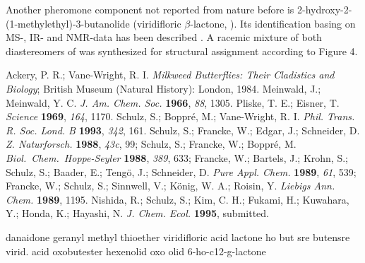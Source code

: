 \documentclass[11pt]{article}
\begin{document}
Another pheromone component not reported from nature before is
2-hydroxy-2-(1-methylethyl)-3-butanolide (viridifloric  $\beta$-lactone, ). Its
identification basing on MS-, IR- and NMR-data has been described \cite{c5}.  A racemic
mixture of both diastereomers of  was synthesized for structural assignment
according to Figure 4.

\begin{thebibliography}{99}
Ackery, P. R.; Vane-Wright, R. I. \emph{Milkweed
Butterflies: Their Cladistics and Biology}; British Museum (Natural
History): London, 1984.
Meinwald, J.; Meinwald, Y. C.
\emph{J. Am. Chem. Soc.}  \textbf{1966}, \emph{88}, 1305.
Pliske, T. E.; Eisner, T. \emph{Science} \textbf{1969},
\emph{164}, 1170.
Schulz, S.; Boppr\'e, M.; Vane-Wright, R. I.
\emph{Phil. Trans. R. Soc. Lond. B}  \textbf{1993}, \emph{342}, 161.
Schulz, S.; Francke, W.; Edgar, J.; Schneider, D. \emph{Z. Naturforsch.} \textbf{1988},
\emph{43c}, 99;  Schulz, S.; Francke, W.;  Boppr\'e, M. \emph{Biol.\ Chem.\ Hoppe-Seyler}
\textbf{1988}, \emph{389}, 633; Francke, W.; Bartels, J.; Krohn, S.; Schulz, S.; Baader,
E.; Teng\"o, J.; Schneider, D. \emph{Pure Appl. Chem.} \textbf{1989}, \emph{61}, 539;
Francke, W.; Schulz, S.; Sinnwell, V.; K\"onig, W. A.;  Roisin, Y. \emph{Liebigs Ann.
Chem.} \textbf{1989}, 1195.
Nishida, R.; Schulz, S.; Kim, C. H.; Fukami, H.; Kuwahara,
Y.; Honda, K.; Hayashi, N. \emph{J. Chem. Ecol.} \textbf{1995}, submitted.
\end{thebibliography}

\clearpage
\begin{theffbibliography}{99}
 danaidone
 geranyl methyl thioether
 viridifloric acid lactone
 ho but sre
 butensre
 virid. acid
 oxobutester
 hexenolid
 oxo olid
 6-ho-c12-g-lactone
\end{theffbibliography}
 
\end{document}
